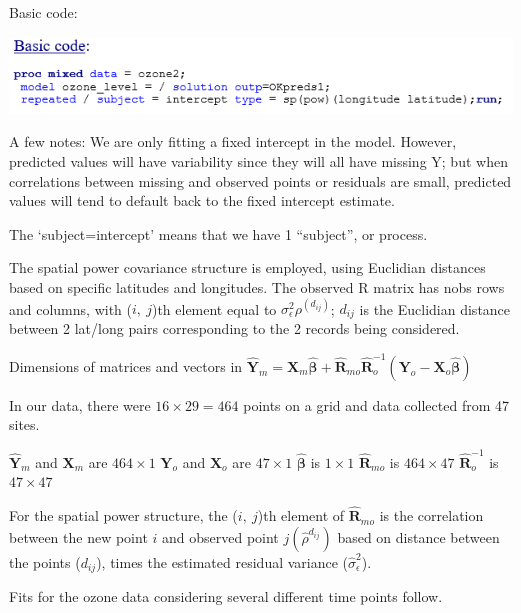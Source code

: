 \documentclass[
  9pt,
  ignorenonframetext,
]{beamer}
\begin{document}
\begin{frame}{Basic code:}
\protect\hypertarget{basic-code}{}
\begin{center}\includegraphics[width=0.7\linewidth]{figs_L22/f3} \end{center}

\begin{block}{A few notes:}
\protect\hypertarget{a-few-notes}{}
We are only fitting a fixed intercept in the model. However, predicted
values will have variability since they will all have missing Y; but
when correlations between missing and observed points or residuals are
small, predicted values will tend to default back to the fixed intercept
estimate.

The `subject=intercept' means that we have 1 ``subject'', or process.

The spatial power covariance structure is employed, using Euclidian
distances based on specific latitudes and longitudes. The observed R
matrix has nobs rows and columns, with (\(i,\ j\))th element equal to
\(\sigma_\epsilon^2 \rho^(d_{ij})\); \(d_{ij}\) is the Euclidian
distance between 2 lat/long pairs corresponding to the 2 records being
considered.

Dimensions of matrices and vectors in
\(\pmb {\hat Y}_m=\pmb X_m \pmb {\hat \beta}+\pmb {\hat R}_{mo} \pmb {\hat R}_o^{-1} (\pmb Y_o- \pmb X_o \pmb {\hat \beta})\)

In our data, there were \(16\times 29=464\) points on a grid and data
collected from 47 sites.

\(\pmb {\hat Y}_m\) and \(\pmb X_m\) are \(464\times 1\) \(\pmb Y_o\)
and \(\pmb X_o\) are \(47\times 1\) \(\pmb {\hat \beta}\) is
\(1\times 1\) \(\pmb {\hat R}_{mo}\) is \(464\times 47\)
\(\pmb {\hat R}_o^{-1}\) is \(47\times 47\)
\end{block}
\end{frame}

\begin{frame}{}
\protect\hypertarget{section-11}{}
For the spatial power structure, the (\(i,\ j\))th element of
\(\pmb {\hat R}_{mo}\) is the correlation between the new point \(i\)
and observed point \(j({\hat \rho}^{d_{ij}})\) based on distance between
the points (\(d_{ij}\)), times the estimated residual variance
(\(\hat \sigma _\epsilon^2\)).

Fits for the ozone data considering several different time points
follow.
\end{frame}
\end{document}
